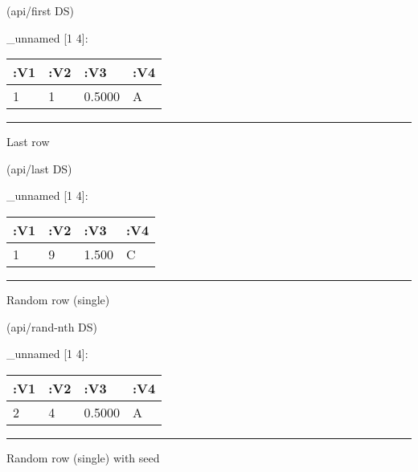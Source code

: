 \documentclass[]{article}
\newenvironment{Shaded}{\begin{snugshade}}{\end{snugshade}}
\newcommand{\NormalTok}[1]{#1}
\begin{document}
\begin{Shaded}
\begin{Highlighting}[]
\NormalTok{(api/first DS)}
\end{Highlighting}
\end{Shaded}

\_unnamed {[}1 4{]}:

\begin{longtable}[]{@{}llll@{}}
\toprule
:V1 & :V2 & :V3 & :V4\tabularnewline
\midrule
\endhead
1 & 1 & 0.5000 & A\tabularnewline
\bottomrule
\end{longtable}

\begin{center}\rule{0.5\linewidth}{0.5pt}\end{center}

Last row

\begin{Shaded}
\begin{Highlighting}[]
\NormalTok{(api/last DS)}
\end{Highlighting}
\end{Shaded}

\_unnamed {[}1 4{]}:

\begin{longtable}[]{@{}llll@{}}
\toprule
:V1 & :V2 & :V3 & :V4\tabularnewline
\midrule
\endhead
1 & 9 & 1.500 & C\tabularnewline
\bottomrule
\end{longtable}

\begin{center}\rule{0.5\linewidth}{0.5pt}\end{center}

Random row (single)

\begin{Shaded}
\begin{Highlighting}[]
\NormalTok{(api/rand-nth DS)}
\end{Highlighting}
\end{Shaded}

\_unnamed {[}1 4{]}:

\begin{longtable}[]{@{}llll@{}}
\toprule
:V1 & :V2 & :V3 & :V4\tabularnewline
\midrule
\endhead
2 & 4 & 0.5000 & A\tabularnewline
\bottomrule
\end{longtable}

\begin{center}\rule{0.5\linewidth}{0.5pt}\end{center}

Random row (single) with seed
\end{document}
